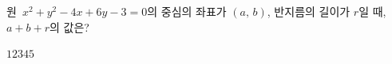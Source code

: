 원~$x^2+y^2-4x+6y-3=0$의 중심의 좌표가 $(a,\,b)$, 반지름의 길이가 $r$일 때, $a+b+r$의 값은?
\begin{choices32}{$1$}{$2$}{$3$}{$4$}{$5$}\end{choices32}
